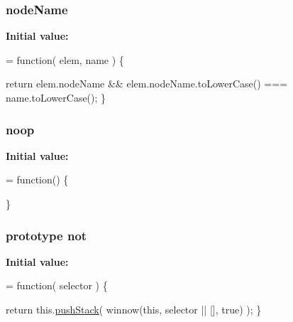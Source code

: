 \subsubsection[{node\+Name}]{ node\+Name}\label{jquery-1_810_82-vsdoc_8js_a269e960a03eef49b8ed3a84932c1334d}
{\bfseries Initial value\+:}
\begin{DoxyCode}
= \textcolor{keyword}{function}( elem, name ) \{

        \textcolor{keywordflow}{return} elem.nodeName && elem.nodeName.toLowerCase() === name.toLowerCase();
    \}
\end{DoxyCode}
\hypertarget{jquery-1_810_82-vsdoc_8js_a7acad2bce0af143b1f94283a7a811103}{}
\subsubsection[{noop}]{ noop}\label{jquery-1_810_82-vsdoc_8js_a7acad2bce0af143b1f94283a7a811103}
{\bfseries Initial value\+:}
\begin{DoxyCode}
= \textcolor{keyword}{function}() \{

\}
\end{DoxyCode}
\hypertarget{jquery-1_810_82-vsdoc_8js_a78ab1ea877c73295e1e4cd1002ad38c7}{}
\subsubsection[{not}]{ {\bf prototype} not}\label{jquery-1_810_82-vsdoc_8js_a78ab1ea877c73295e1e4cd1002ad38c7}
{\bfseries Initial value\+:}
\begin{DoxyCode}
= \textcolor{keyword}{function}( selector ) \{


        \textcolor{keywordflow}{return} this.\hyperlink{jquery-1_810_82-vsdoc_8js_afc3a7db1ef2b526338c06c07cecccd44}{pushStack}( winnow(\textcolor{keyword}{this}, selector || [], \textcolor{keyword}{true}) );
    \}
\end{DoxyCode}
\hypertarget{jquery-1_810_82-vsdoc_8js_a1ecd248e0e501ce89712536174fdc6e3}{}
